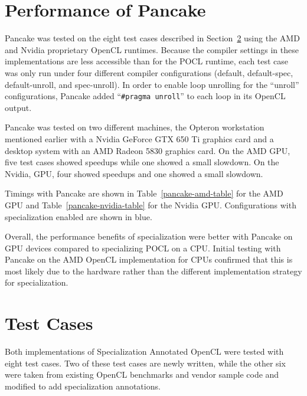 \documentclass{acm_proc_article-sp}
\begin{document}
\section{Performance of Pancake}

Pancake was tested on the eight test cases described in
Section~\ref{test-cases} using the AMD and Nvidia proprietary OpenCL runtimes.
Because the compiler settings in these implementations are less accessible than
for the POCL runtime, each test case was only run under four different compiler
configurations (default, default-spec, default-unroll, and spec-unroll). In
order to enable loop unrolling for the ``unroll'' configurations, Pancake added
``{\tt \#pragma unroll}'' to each loop in its OpenCL output.

Pancake was tested on two different machines, the Opteron workstation mentioned
earlier with a Nvidia GeForce GTX 650 Ti graphics card and a desktop system
with an AMD Radeon 5830 graphics card. On the AMD GPU, five test cases showed
speedups while one showed a small slowdown. On the Nvidia, GPU, four showed
speedups and one showed a small slowdown.

Timings with Pancake are shown in Table~\ref{pancake-amd-table} for the AMD GPU
and Table~\ref{pancake-nvidia-table} for the Nvidia GPU. Configurations with
specialization enabled are shown in blue.


Overall, the performance benefits of specialization were better with Pancake on
GPU devices compared to specializing POCL on a CPU. Initial testing with
Pancake on the AMD OpenCL implementation for CPUs confirmed that this is most
likely due to the hardware rather than the different implementation strategy
for specialization. 

% 




\section{Test Cases}
\label{test-cases}

Both implementations of Specialization Annotated OpenCL were tested with eight
test cases. Two of these test cases are newly written, while the other six were
taken from existing OpenCL benchmarks and vendor sample code and modified to
add specialization annotations.
\end{document}
